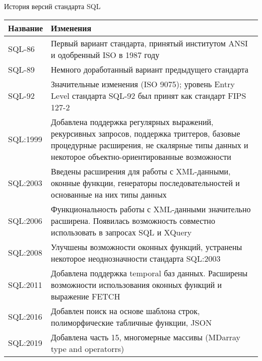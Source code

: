 \documentclass[12pt]{article}
\begin{document}
\begin{nota}{История версий стандарта SQL}
    \begin{center}
        \begin{tabular}{| m{5em} | m{33em} |}
            \hline
            Название & Изменения \\ 
            \hline
            SQL-86 & Первый вариант стандарта, принятый институтом ANSI и одобренный ISO в 1987 году \\
            \hline
            SQL-89 & Немного доработанный вариант предыдущего стандарта \\ 
            \hline
            SQL-92 & Значительные изменения (ISO 9075); уровень Entry Level стандарта SQL-92 был принят как стандарт FIPS 127-2 \\
            \hline
            SQL:1999 & Добавлена поддержка регулярных выражений, рекурсивных запросов, поддержка триггеров, базовые процедурные расширения, не скалярные типы данных и некоторое объектно-ориентированные возможности \\
            \hline
            SQL:2003 & Введены расширения для работы с XML-данными, оконные функции, генераторы последовательностей и основанные на них типы данных \\
            \hline
            SQL:2006 & Функциональность работы с XML-данными значительно расширена. Появилась возможность совместно использовать в запросах SQL и XQuery \\
            \hline
            SQL:2008 & Улучшены возможности оконных функций, устранены некоторое неоднозначности стандарта SQL:2003 \\
            \hline
            SQL:2011 & Добавлена поддержка temporal баз данных. Расширены возможности использования оконных функций и выражение FETCH \\
            \hline
            SQL:2016 & Добавлен поиск на основе шаблона строк, полиморфические табличные функции, JSON \\
            \hline
            SQL:2019 & Добавлена часть 15, многомерные массивы (MDarray type and operatorrs) \\
            \hline
        \end{tabular}
    \end{center}
\end{nota}
\end{document}
